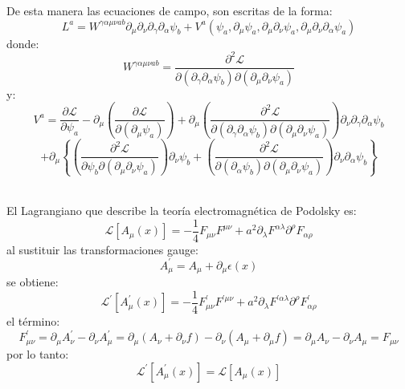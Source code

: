 \documentclass[a4paper,12pt]{article}
\begin{document}
De esta manera las ecuaciones de campo, son escritas de la forma:
\begin{equation}
L^a=W^{\gamma\alpha\mu\nu ab}\partial_\mu\partial_\nu\partial_\gamma\partial_\alpha\psi_b+V^a(\psi_a,\partial_\mu\psi_a,\partial_\mu\partial_\nu\psi_a,\partial_\mu\partial_\nu\partial_\alpha\psi_a) 
\end{equation}
donde:
\begin{equation}
W^{\gamma\alpha\mu\nu ab}= \frac{\partial^2\mathscr{L} }{\partial( \partial_\gamma\partial_\alpha\psi_b)\partial(\partial_{\mu}\partial_{\nu} \psi_a)}
\end{equation}
y:
\begin{equation}
V^a=\frac{\partial\mathscr{L} }{\partial \psi_a}-\partial_{\mu}\left(\frac{\partial\mathscr{L} }{\partial(\partial_{\mu} \psi_a)}\right) +\partial_{\mu}\left(\frac{\partial^2\mathscr{L} }{\partial( \partial_\gamma\partial_\alpha\psi_b)\partial(\partial_{\mu}\partial_{\nu} \psi_a)}\right)\partial_\nu\partial_\gamma\partial_\alpha\psi_b 
\end{equation}
$$+\partial_\mu\left\{\left(\frac{\partial^2\mathscr{L} }{\partial \psi_b\partial(\partial_{\mu}\partial_{\nu} \psi_a)}\right)\partial_\nu\psi_b+ \left(\frac{\partial^2\mathscr{L} }{\partial( \partial_\alpha\psi_b)\partial(\partial_{\mu}\partial_{\nu} \psi_a)}\right)\partial_\nu\partial_\alpha\psi_b\right\}$$
\vspace{0,4cm}

\\

El Lagrangiano que describe la teoría electromagnética de Podolsky es:
\begin{equation}
\mathscr{L}[A_{\mu}(x)]=-\frac{1}{4} F_{\mu \nu}F^{\mu \nu}+a^2\partial_\lambda F^{\alpha\lambda}\partial^\rho F_{\alpha\rho} 
\end{equation}  
al sustituir las transformaciones gauge:
\begin{equation}
A_{\mu}^{'}=A_{\mu}+\partial_{\mu} \epsilon(x) 
\end{equation}
se obtiene:
\begin{equation}
\mathscr{L}^{'}[A_{\mu}^{'}(x)]=-\frac{1}{4} F_{\mu \nu}^{'}F^{'\mu \nu}+a^2\partial_\lambda F^{'\alpha\lambda}\partial^\rho F_{\alpha\rho}^{'} 
\end{equation} 
el término:
\begin{equation}
F_{\mu \nu}^{'}=\partial_\mu A_\nu^{'}-\partial_\nu A_\mu^{'}= \partial_\mu(A_{\nu}+\partial_{\nu} f)-\partial_\nu(A_{\mu}+\partial_{\mu} f)=\partial_\mu A_\nu-\partial_\nu A_\mu=F_{\mu \nu}
\end{equation}
por lo tanto:
\begin{equation}
\mathscr{L}^{'}[A_{\mu}^{'}(x)]=\mathscr{L}[A_{\mu}(x)] 
\end{equation}
\vspace{0,4cm}
\end{document}
